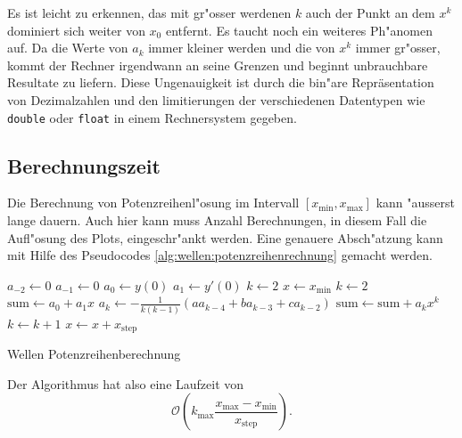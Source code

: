 Es ist leicht zu erkennen, das mit gr"osser werdenen $k$ auch der Punkt an dem 
$x^k$ dominiert sich weiter von $x_0$ entfernt. Es taucht noch ein weiteres 
Ph"anomen auf. Da die Werte von $a_k$ immer kleiner werden und die von $x^k$ 
immer gr"osser, kommt der Rechner irgendwann an seine Grenzen und beginnt 
unbrauchbare Resultate zu liefern. Diese Ungenauigkeit ist durch die bin"are 
Repräsentation von Dezimalzahlen und den limitierungen der verschiedenen 
Datentypen wie \texttt{double} oder \texttt{float} in einem Rechnersystem 
gegeben.

\subsection{Berechnungszeit}
Die Berechnung von Potenzreihenl"osung im Intervall
$[x_{\text{min}},x_{\text{max}}]$ kann "ausserst lange dauern. Auch hier kann
muss Anzahl Berechnungen, in diesem Fall die Aufl"osung des Plots,
eingeschr"ankt werden. Eine genauere Absch"atzung kann mit Hilfe des
Pseudocodes \ref{alg:wellen:potenzreihenrechnung} gemacht werden.

\begin{algorithm}
	\begin{algorithmic}[1]
		\State $a_{-2} \gets 0$
		\State $a_{-1} \gets 0$
		\State $a_0 \gets y(0)$
		\State $a_1 \gets y'(0)$
		\State $k \gets 2$
		\State $x \gets x_{\text{min}}$
			\State $k \gets 2$
			\State $\text{sum} \gets a_0 + a_1x$
				\State $a_k \gets -\frac{1}{k(k-1)}			
				(aa_{k-4}+ba_{k-3}+ca_{k-2})$
				\State $\text{sum} \gets \text{sum} + a_k x^k$
				\State $k \gets k + 1$
			\EndFor
			\State $x \gets x + x_{\text{step}}$
		\EndFor
	\end{algorithmic}
	\caption{Wellen Potenzreihenberechnung} 
	\label{alg:wellen:potenzreihenrechnung}
\end{algorithm}

Der Algorithmus hat also eine Laufzeit von
\begin{equation*}
	\mathcal{O}\left(k_{\text{max}}\frac{x_{\text{max}}-x_{\text{min}}} 
	{x_{\text{step}}}\right).
\end{equation*}

